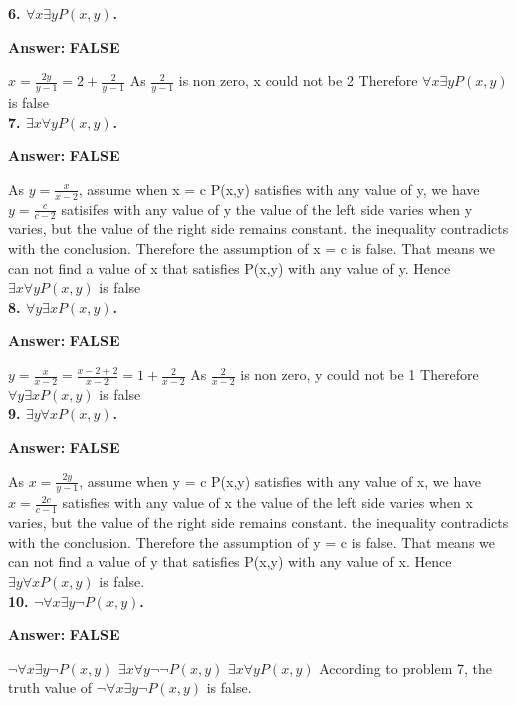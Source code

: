 \documentclass{article}
\begin{document}
\begin{large}
\textbf{6. $\forall x \exists yP(x,y)$.}

\textbf{Answer:}  \textbf{FALSE}

$x = \frac{2y}{y-1} = 2 + \frac{2}{y-1}$
As $\frac{2}{y-1}$ is non zero, x could not be 2
Therefore $\forall x \exists yP(x,y)$ is false\\

\textbf{7. $\exists x \forall yP(x,y)$.}

\textbf{Answer:}   \textbf{FALSE}



As $y = \frac{x}{x-2}$, 
assume when x = c P(x,y) satisfies with any value of y, 
we have $y = \frac{c}{c-2}$ satisifes with any value of y
the value of the left side varies when y varies, 
but the value of the right side remains constant.
the inequality contradicts with the conclusion.
Therefore the assumption of x = c is false.
That means we can not find a value of x that satisfies P(x,y) with any value of y.
Hence $\exists x \forall yP(x,y)$ is false\\

\textbf{8. $\forall y \exists xP(x,y)$.}

\textbf{Answer:}   \textbf{FALSE}

$y = \frac{x}{x-2} = \frac{x-2+2}{x-2} = 1 + \frac{2}{x-2}$ 
As $\frac{2}{x-2}$ is non zero, y could not be 1
Therefore $\forall y \exists xP(x,y)$ is false\\

\textbf{9. $\exists y \forall xP(x,y)$.}

\textbf{Answer:}   \textbf{FALSE}

As $x = \frac{2y}{y-1}$, 
assume when y = c P(x,y) satisfies with any value of x,
we have $x = \frac{2c}{c-1}$ satisfies with any value of x
the value of the left side varies when x varies,
but the value of the right side remains constant.
the inequality contradicts with the conclusion.
Therefore the assumption of y = c is false.
That means we can not find a value of y that satisfies P(x,y) with any value of x.
Hence $\exists y \forall xP(x,y)$ is false.\\

\textbf{10. $\lnot \forall x \exists y \lnot P(x,y)$.}

\textbf{Answer:} \textbf{FALSE}


$\lnot \forall x \exists y \lnot P(x,y)$
$\exists x \forall y \lnot \lnot P(x,y)$
$\exists x \forall y P(x,y)$
According to problem 7, the truth value of $\lnot \forall x \exists y \lnot P(x,y)$ is false.\\



\end{large}
\end{document}
